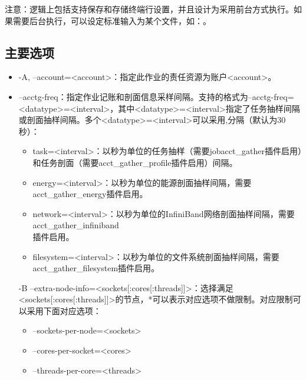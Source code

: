 注意：逻辑上包括支持保存和存储终端行设置，并且设计为采用前台方式执行。如果需要后台执行，可以设定标准输入为某个文件，如：。

\subsection{主要选项}
\begin{itemize}
	\item -A, --account=<account>：指定此作业的责任资源为账户<account>。
    \item --acctg-freq：指定作业记账和剖面信息采样间隔。支持的格式为--acctg-freq=<datatype>=<interval>，其中<datatype>=<interval>指定了任务抽样间隔或剖面抽样间隔。多个<datatype>=<interval>可以采用,分隔（默认为30秒）：
\begin{itemize}
	\item task=<interval>：以秒为单位的任务抽样（需要jobacct\_gather插件启用）和任务剖面（需要acct\_gather\_profile插件启用）间隔。
    \item energy=<interval>：以秒为单位的能源剖面抽样间隔，需要acct\_gather\_energy插件启用。
    \item network=<interval>：以秒为单位的InfiniBand网络剖面抽样间隔，需要acct\_gather\_infiniband\\插件启用。
    \item filesystem=<interval>：以秒为单位的文件系统剖面抽样间隔，需要acct\_gather\_filesystem插件启用。
\end{itemize}
       -B --extra-node-info=<sockets[:cores[:threads]]>：选择满足<sockets[:cores[:threads]]>的节点，*可以表示对应选项不做限制。对应限制可以采用下面对应选项：
\begin{itemize}
	\item --sockets-per-node=<sockets>
    \item --cores-per-socket=<cores>
    \item --threads-per-core=<threads>
\end{itemize}


\end{itemize}
